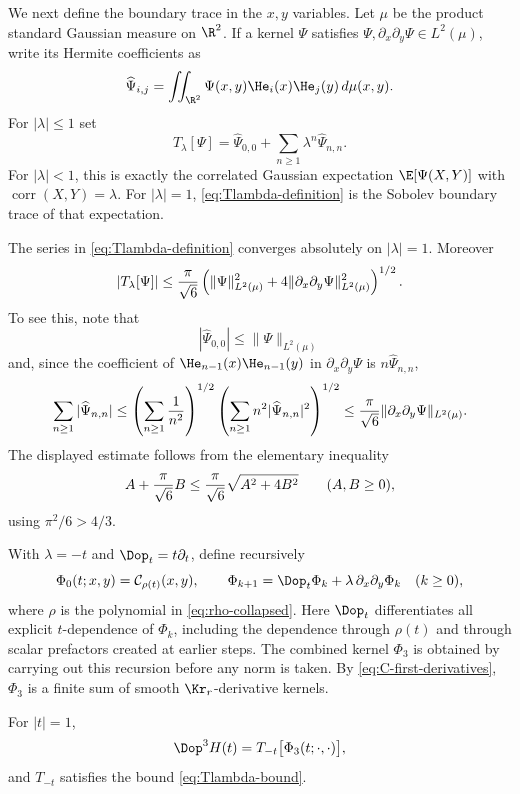 We next define the boundary trace in the $x,y$ variables.  Let $\mu$ be the product standard Gaussian measure on $\R^2$.  If a kernel $\Psi$ satisfies $\Psi,\partial_x\partial_y\Psi\in L^2(\mu)$, write its Hermite coefficients as
\[
  \widehat\Psi_{i,j}=\iint_{\R^2}\Psi(x,y)\He_i(x)\He_j(y)\,d\mu(x,y).
\]
For $|\lambda|\le1$ set
\begin{equation}\label{eq:Tlambda-definition}
  T_\lambda[\Psi]
  =\widehat\Psi_{0,0}+\sum_{n\ge1}\lambda^n\widehat\Psi_{n,n}.
\end{equation}
For $|\lambda|<1$, this is exactly the correlated Gaussian expectation $\E[\Psi(X,Y)]$ with $\operatorname{corr}(X,Y)=\lambda$.  For $|\lambda|=1$, \eqref{eq:Tlambda-definition} is the Sobolev boundary trace of that expectation.

The series in \eqref{eq:Tlambda-definition} converges absolutely on $|\lambda|=1$.  Moreover
\begin{equation}\label{eq:Tlambda-bound}
  |T_\lambda[\Psi]|
  \le {\pi\over\sqrt6}
  \left(\|\Psi\|_{L^2(\mu)}^2+4\|\partial_x\partial_y\Psi\|_{L^2(\mu)}^2\right)^{1/2}.
\end{equation}
To see this, note that
\[
  |\widehat\Psi_{0,0}|\le\|\Psi\|_{L^2(\mu)}
\]
and, since the coefficient of $\He_{n-1}(x)\He_{n-1}(y)$ in $\partial_x\partial_y\Psi$ is $n\widehat\Psi_{n,n}$,
\[
  \sum_{n\ge1}|\widehat\Psi_{n,n}|
  \le\left(\sum_{n\ge1}{1\over n^2}\right)^{1/2}
      \left(\sum_{n\ge1}n^2|\widehat\Psi_{n,n}|^2\right)^{1/2}
  \le {\pi\over\sqrt6}\|\partial_x\partial_y\Psi\|_{L^2(\mu)}.
\]
The displayed estimate follows from the elementary inequality
\[
  A+{\pi\over\sqrt6}B
  \le {\pi\over\sqrt6}\sqrt{A^2+4B^2}\qquad(A,B\ge0),
\]
using $\pi^2/6>4/3$.

With $\lambda=-t$ and $\Dop_t=t\partial_t$, define recursively
\begin{equation}\label{eq:Phi-recursion}
  \Phi_0(t;x,y)=\mathcal C_{\rho(t)}(x,y),
  \qquad
  \Phi_{k+1}=\Dop_t\Phi_k+\lambda\,\partial_x\partial_y\Phi_k\quad(k\ge0),
\end{equation}
where $\rho$ is the polynomial in \eqref{eq:rho-collapsed}.  Here $\Dop_t$ differentiates all explicit $t$-dependence of $\Phi_k$, including the dependence through $\rho(t)$ and through scalar prefactors created at earlier steps.  The combined kernel $\Phi_3$ is obtained by carrying out this recursion before any norm is taken.  By \eqref{eq:C-first-derivatives}, $\Phi_3$ is a finite sum of smooth $\Kr_r$-derivative kernels.

\begin{lemma}\label{lem:trace-rep}
For $|t|=1$,
\[
  \Dop^3H(t)=T_{-t}\bigl[\Phi_3(t;\cdot,\cdot)\bigr],
\]
and $T_{-t}$ satisfies the bound \eqref{eq:Tlambda-bound}.
\end{lemma}

